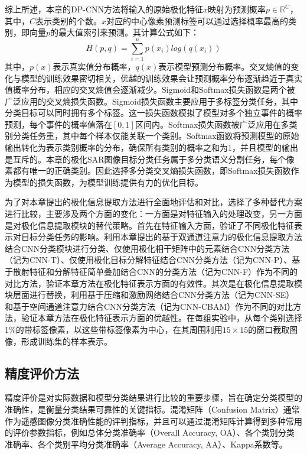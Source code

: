 综上所述，本章的DP-CNN方法将输入的原始极化特征$x$映射为预测概率$p\in \mathbb{R}^{C}$，其中，$C$表示类别的个数。$x$对应的中心像素预测标签可以通过选择概率最高的类别，即向量$p$的最大值索引来预测。其计算公式如下：
\begin{equation}
  H(p,q)=\sum_{i=1}^{n}p(x_i)log(q(x_i))
\end{equation}
其中，$p(x)$表示真实值分布概率，$q(x)$表示模型预测分布概率。交叉熵值的变化与模型的训练效果密切相关，优越的训练效果会让预测概率分布逐渐趋近于真实值概率分布，相应的交叉熵值会逐渐减少。Sigmoid和Softmax损失函数是两个被广泛应用的交叉熵损失函数。Sigmoid损失函数主要应用于多标签分类任务，其中分类目标可以同时拥有多个标签。这一损失函数模拟了模型对多个独立事件的概率预测，每个事件的概率值落在$[0,1]$区间内。Softmax损失函数被广泛应用在多类别分类任务重，其中每个样本仅能关联一个类别。Softmax函数将预测模型的原始输出转化为表示类别概率的分布，确保所有类别的概率之和为1，并且模型的输出是互斥的。本章的极化SAR图像目标分类任务属于多分类语义分割任务，每个像素都有唯一的正确类别。因此选择多分类交叉熵损失函数，即Softmax损失函数作为模型的损失函数，为模型训练提供有力的优化目标。

为了对本章提出的极化信息提取方法进行全面地评估和对比，选择了多种替代方案进行比较，主要涉及两个方面的变化：一方面是对特征输入的处理改变，另一方面是对极化信息提取模块的替代策略。首先在特征输入方面，验证了不同极化特征表示对目标分类任务的影响。利用本章提出的基于双通道注意力的极化信息提取方法结合CNN分类模块进行分类、仅使用极化相干矩阵中的元素结合CNN分类方法（记为CNN-T）、仅使用极化目标分解特征结合CNN分类方法（记为CNN-P）、基于散射特征和分解特征简单叠加结合CNN的分类方法（记为CNN-F）作为不同的对比方法，验证本章方法在极化特征表示方面的有效性。其次是在极化信息提取模块层面进行替换，利用基于压缩和激励网络结合CNN分类方法（记为CNN-SE）和基于空间通道注意力结合CNN分类方法（记为CNN-CBAM）作为不同的对比方法，验证本章方法在极化特征表示方面的优越性。在每组实验中，从每个类别选择1\%的带标签像素，以这些带标签像素为中心，在其周围利用$15 \times 15$的窗口截取图像，形成训练集的样本表示。

\subsection{精度评价方法}
精度评价是对实际数据和模型分类结果进行比较的重要步骤，旨在确定分类模型的准确性，是衡量分类结果可靠性的关键指标。混淆矩阵（Confusion Matrix）通常作为遥感图像分类准确性能的评判指标，并且可以通过混淆矩阵计算得到多种常用的评价参数指标，例如总体分类准确率（Overall Accuracy, OA）、各个类别分类准确率、各个类别平均分类准确率（Average Accuracy, AA）、Kappa系数等。

